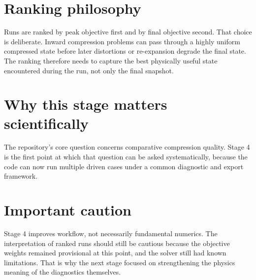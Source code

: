 \documentclass[11pt]{article}
\begin{document}
\section{Ranking philosophy}
Runs are ranked by peak objective first and by final objective second. That choice is deliberate. Inward compression problems can pass through a highly uniform compressed state before later distortions or re-expansion degrade the final state. The ranking therefore needs to capture the best physically useful state encountered during the run, not only the final snapshot.

\section{Why this stage matters scientifically}
The repository's core question concerns comparative compression quality. Stage 4 is the first point at which that question can be asked systematically, because the code can now run multiple driven cases under a common diagnostic and export framework.

\section{Important caution}
Stage 4 improves workflow, not necessarily fundamental numerics. The interpretation of ranked runs should still be cautious because the objective weights remained provisional at this point, and the solver still had known limitations. That is why the next stage focused on strengthening the physics meaning of the diagnostics themselves.
\end{document}
